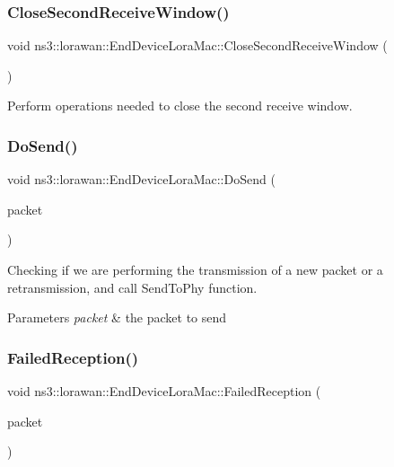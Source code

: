 \subsubsection{\texorpdfstring{Close\+Second\+Receive\+Window()}{CloseSecondReceiveWindow()}}
{\footnotesize\ttfamily void ns3\+::lorawan\+::\+End\+Device\+Lora\+Mac\+::\+Close\+Second\+Receive\+Window (\begin{DoxyParamCaption}\item[{void}]{ }\end{DoxyParamCaption})}

Perform operations needed to close the second receive window. \mbox{\label{classns3_1_1lorawan_1_1EndDeviceLoraMac_a1e1e4b2c0250f5d37456817f936e5eda}} 
\subsubsection{\texorpdfstring{Do\+Send()}{DoSend()}}
{\footnotesize\ttfamily void ns3\+::lorawan\+::\+End\+Device\+Lora\+Mac\+::\+Do\+Send (\begin{DoxyParamCaption}\item[{Ptr$<$ Packet $>$}]{packet }\end{DoxyParamCaption})\hspace{0.3cm}{\ttfamily [virtual]}}

Checking if we are performing the transmission of a new packet or a retransmission, and call Send\+To\+Phy function.


\begin{DoxyParams}{Parameters}
{\em packet} & the packet to send \\
\hline
\end{DoxyParams}
\mbox{\label{classns3_1_1lorawan_1_1EndDeviceLoraMac_ab1fe806e8a0f5aa3a17fd1c39e831d44}} 
\subsubsection{\texorpdfstring{Failed\+Reception()}{FailedReception()}}
{\footnotesize\ttfamily void ns3\+::lorawan\+::\+End\+Device\+Lora\+Mac\+::\+Failed\+Reception (\begin{DoxyParamCaption}\item[{Ptr$<$ Packet const $>$}]{packet }\end{DoxyParamCaption})\hspace{0.3cm}{\ttfamily [virtual]}}

